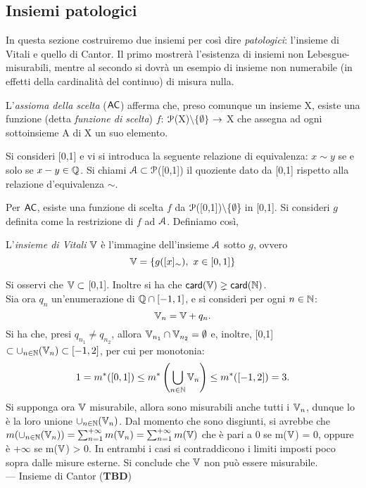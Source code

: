 \documentclass[Completo.tex]{subfiles}
\begin{document}
	\subsection{Insiemi patologici}
	In questa sezione costruiremo due insiemi per così dire \textit{patologici}: l'insieme di Vitali e quello di Cantor. Il primo mostrerà l'esistenza di insiemi non Lebesgue-misurabili, mentre al secondo si dovrà un esempio di insieme non numerabile (in effetti della cardinalità del continuo) di misura nulla.
	\begin{Def}
		L'\textit{assioma della scelta} ($\sf[AC]$) afferma che, preso comunque un insieme X, esiste una funzione (detta \textit{funzione di scelta}) $f$: $\eu[P]$(X)$\setminus \{\emptyset\}$ $\rightarrow$ X che assegna ad ogni sottoinsieme A di X un suo elemento.
	\end{Def}
	\begin{Def}
		Si consideri [0,1] e vi si introduca la seguente relazione di equivalenza: $x \sim y$ se e solo se $x-y \in \bb[Q]$. Si chiami $\eu[A] \sset \eu[P]$([0,1]) il quoziente dato da [0,1] rispetto alla relazione d'equivalenza $\sim$.
	\end{Def}
	Per $\sf[AC]$, esiste una funzione di scelta $f$ da $\eu[P]$([0,1])$\setminus$\{$\emptyset$\} in [0,1]. Si consideri $g$ definita come la restrizione di $f$ ad $\eu[A]$. Definiamo così,
	\begin{Def}
		L'\textit{insieme di Vitali} $\bb[V]$ è l'immagine dell'insieme $\eu[A]$ sotto $g$, ovvero
		\begin{equation*}
		\bb[V] = \{g([x]_{\sim}), \ x \in [0,1]\}
		\end{equation*}
	\end{Def}
	Si osservi che $\bb[V] \sset$ [0,1]. Inoltre si ha che $\sf[card](\bb[V]) \gneq \sf[card](\bb[N])$. \\
	Sia ora $q_n$ un'enumerazione di $\bb[Q] \cap [-1,1]$, e si consideri per ogni $n \in \bb[N]$:
	\begin{equation*}
	\bb[V]_n = \bb[V] + q_n.
	\end{equation*}
	Si ha che, presi $q_{n_1} \neq q_{n_2}$, allora $\bb[V]_{n_1} \cap \bb[V]_{n_2} = \emptyset$ e, inoltre, [0,1] $\sset \cup_{n \in \bb[N]}(\bb[V]_{n}) \sset [-1,2]$, per cui per monotonia:
	\begin{equation*}
	1 = m^{*}([0,1]) \leq m^{*}\left(\bigcup_{n \in \bb[N]} \bb[V]_n \right) \leq m^{*}([-1,2]) = 3.
	\end{equation*}
	Si supponga ora $\bb[V]$ misurabile, allora sono misurabili anche tutti i $\bb[V]_n$, dunque lo è la loro unione $\cup_{n \in \bb[N]}(\bb[V]_{n})$. Dal momento che sono disgiunti, si avrebbe che $m(\cup_{n \in \bb[N]}(\bb[V]_{n})) = \sum_{n=1}^{+\infty}m(\bb[V]_n) = \sum_{n=1}^{+\infty}m(\bb[V])$ che è pari a 0 se m($\bb[V]$) = 0, oppure è +$\infty$ se m($\bb[V]$) > 0. In entrambi i casi si contraddicono i limiti imposti poco sopra dalle misure esterne. Si conclude che $\bb[V]$ non può essere misurabile. \\
	--- Insieme di Cantor (\textbf{TBD})
\end{document}
